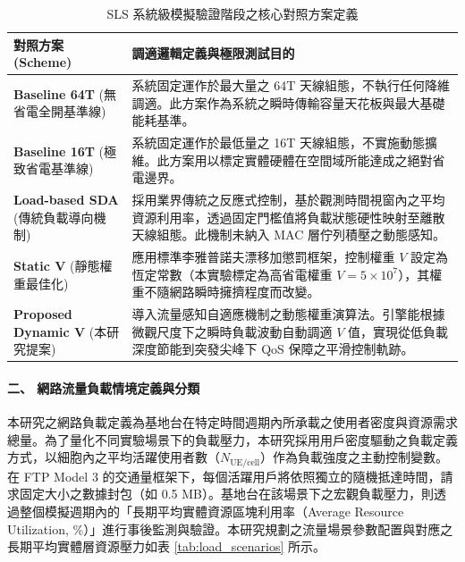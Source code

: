 \begin{table}[htbp]
\centering
\caption{SLS 系統級模擬驗證階段之核心對照方案定義}
\label{tab:sls_schemes}
\renewcommand{\arraystretch}{1.5}
\begin{tabularx}{\textwidth}{|p{}|X|}
\hline
\textbf{對照方案 (Scheme)} & \textbf{調適邏輯定義與極限測試目的} \\ \hline
\textbf{Baseline 64T} \newline (無省電全開基準線) & 系統固定運作於最大量之 64T 天線組態，不執行任何降維調適。此方案作為系統之瞬時傳輸容量天花板與最大基礎能耗基準。 \\ \hline
\textbf{Baseline 16T} \newline (極致省電基準線) & 系統固定運作於最低量之 16T 天線組態，不實施動態擴維。此方案用以標定實體硬體在空間域所能達成之絕對省電邊界。 \\ \hline
\textbf{Load-based SDA} \newline (傳統負載導向機制) & 採用業界傳統之反應式控制，基於觀測時間視窗內之平均資源利用率，透過固定門檻值將負載狀態硬性映射至離散天線組態。此機制未納入 MAC 層佇列積壓之動態感知。 \\ \hline
\textbf{Static V} \newline (靜態權重最佳化) & 應用標準李雅普諾夫漂移加懲罰框架，控制權重 $V$ 設定為恆定常數（本實驗標定為高省電權重 $V = 5 \times 10^7$），其權重不隨網路瞬時擁擠程度而改變。 \\ \hline
\textbf{Proposed Dynamic V} \newline (本研究提案) & 導入流量感知自適應機制之動態權重演算法。引擎能根據微觀尺度下之瞬時負載波動自動調適 $V$ 值，實現從低負載深度節能到突發尖峰下 QoS 保障之平滑控制軌跡。 \\ \hline
\end{tabularx}
\end{table}


\paragraph{二、 網路流量負載情境定義與分類}
本研究之網路負載定義為基地台在特定時間週期內所承載之使用者密度與資源需求總量。為了量化不同實驗場景下的負載壓力，本研究採用用戶密度驅動之負載定義方式，以細胞內之平均活躍使用者數（$N_{\text{UE/cell}}$）作為負載強度之主動控制變數。在 FTP Model 3 的交通量框架下，每個活躍用戶將依照獨立的隨機抵達時間，請求固定大小之數據封包（如 0.5 MB）。基地台在該場景下之宏觀負載壓力，則透過整個模擬週期內的「長期平均實體資源區塊利用率（Average Resource Utilization, \%）」進行事後監測與驗證。本研究規劃之流量場景參數配置與對應之長期平均實體層資源壓力如表 \ref{tab:load_scenarios} 所示。

